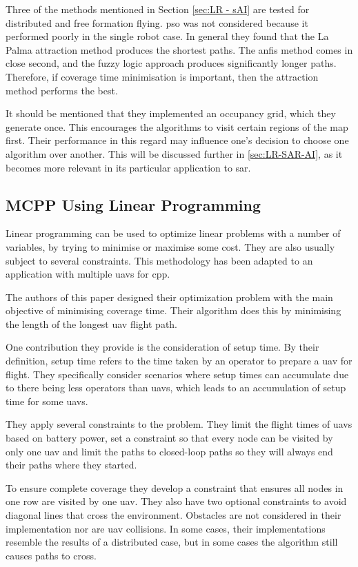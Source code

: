 Three of the methods mentioned in Section \ref{sec:LR - sAI} are tested for distributed and free formation flying. \ac{pso} was not considered because it performed poorly in the single robot case. In general they found that the La Palma attraction method produces the shortest paths. The \ac{anfis} method comes in close second, and the fuzzy logic approach produces significantly longer paths. Therefore, if coverage time minimisation is important, then the attraction method performs the best.

It should be mentioned that they implemented an occupancy grid, which they generate once. This encourages the algorithms to visit certain regions of the map first. Their performance in this regard may influence one's decision to choose one algorithm over another. This will be discussed further in \ref{sec:LR-SAR-AI}, as it becomes more relevant in its particular application to \ac{sar}.
\subsection{MCPP Using Linear Programming}
Linear programming can be used to optimize linear problems with a number of variables, by trying to minimise or maximise some cost. They are also usually subject to several constraints. This methodology has been adapted to an application with multiple \acp{uav} for \ac{cpp}. \cite{Avellar2015}

The authors of this paper designed their optimization problem with the main objective of minimising coverage time. Their algorithm does this by minimising the length of the longest \ac{uav} flight path. 

One contribution they provide is the consideration of setup time. By their definition, setup time refers to the time taken by an operator to prepare a \ac{uav} for flight. They specifically consider scenarios where setup times can accumulate due to there being less operators than \acp{uav}, which leads to an accumulation of setup time for some \acp{uav}.

They apply several constraints to the problem. They limit the flight times of \acp{uav} based on battery power, set a constraint so that every node can be visited by only one \ac{uav} and limit the paths to closed-loop paths so they will always end their paths where they started. 

To ensure complete coverage they develop a constraint that ensures all nodes in one row are visited by one \ac{uav}. They also have two optional constraints to avoid diagonal lines that cross the environment. Obstacles are not considered in their implementation nor are \ac{uav} collisions. In some cases, their implementations resemble the results of a distributed case, but in some cases the algorithm still causes paths to cross.
